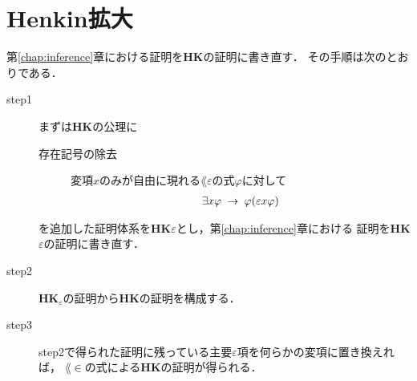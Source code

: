 \section{Henkin拡大}
	第\ref{chap:inference}章における証明を{\bf HK}の証明に書き直す．
	その手順は次のとおりである．
	
	\begin{description}
		\item[step1]
			まずは{\bf HK}の公理に
			\begin{description}
				\item[存在記号の除去] 
					変項$x$のみが自由に現れる$\lang{\varepsilon}$の式$\varphi$に対して
					\begin{align}
						\exists x \varphi \hspace{0.25em}\rightarrow\hspace{0.25em} \varphi(\varepsilon x \varphi)
					\end{align}
			\end{description}
			を追加した証明体系を{\bf HK$\varepsilon$}とし，第\ref{chap:inference}章における
			証明を{\bf HK$\varepsilon$}の証明に書き直す．
			
		\item[step2]
			{\bf HK}${}_\varepsilon$の証明から{\bf HK}の証明を構成する．
			
		\item[step3]
			step2で得られた証明に残っている主要$\varepsilon$項を何らかの変項に置き換えれば，
			$\lang{\in}$の式による{\bf HK}の証明が得られる．
	\end{description}
	
